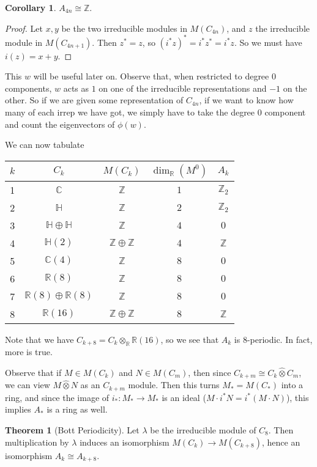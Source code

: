 \documentclass{shortart}
\theoremstyle{definition}
\newtheorem*{cor}{Corollary}
\newtheorem*{thm}{Theorem}
\newcommand\R{\mathbb{R}}
\newcommand\C{\mathbb{C}}
\renewcommand\H{\mathbb{H}}
\newcommand\Z{\mathbb{Z}}
\newcommand\gotimes{\mathbin{\hat\otimes}}
\begin{document}
\begin{cor}
  $A_{4n} \cong \Z$.
\end{cor}

\begin{proof}
  Let $x, y$ be the two irreducible modules in $M(C_{4n})$, and $z$ the irreducible module in $M(C_{4n + 1})$. Then $z^* = z$, so $(i^*z)^* = i^*z^* = i^*z$. So we must have $i(z) = x + y$.
\end{proof}
This $w$ will be useful later on. Observe that, when restricted to degree $0$ components, $w$ acts as $1$ on one of the irreducible representations and $-1$ on the other. So if we are given some representation of $C_{4n}$, if we want to know how many of each irrep we have got, we simply have to take the degree $0$ component and count the eigenvectors of $\phi(w)$.

We can now tabulate
\begin{center}
  \begin{tabular}{ccccc}
    \toprule
    $k$ & $C_k$ & $M(C_k)$ & $\dim_\R (M^0)$ & $A_k$\\
    \midrule
    1 & $\C$ & $\Z$ & $1$ & $\Z_2$\\
    2 & $\H$ & $\Z$ & $2$ & $\Z_2$\\
    3 & $\H \oplus \H$ & $\Z$ & $4$  & $0$\\
    4 & $\H(2)$ & $\Z \oplus \Z$ & $4$& $\Z$\\
    5 & $\C(4)$ & $\Z$ & $8$ & $0$\\
    6 & $\R(8)$ & $\Z$ & $8$ & $0$\\
    7 & $\R(8) \oplus \R(8)$ & $\Z$ & $8$ & $0$\\
    8 & $\R(16)$ & $\Z \oplus \Z$ & $8$& $\Z$\\
    \bottomrule
  \end{tabular}
\end{center}
Note that we have $C_{k + 8} = C_k \otimes_\R \R(16)$, so we see that $A_k$ is $8$-periodic. In fact, more is true.

Observe that if $M \in M(C_k)$ and $N \in M(C_m)$, then since $C_{k + m} \cong C_k \gotimes C_m$, we can view $M \gotimes N$ as an $C_{k + m}$ module. Then this turns $M_* = M(C_*)$ into a ring, and since the image of $i_*: M_* \to M_*$ is an ideal ($M \cdot i^* N = i^* (M \cdot N)$), this implies $A_*$ is a ring as well.

\begin{thm}[Bott Periodicity]
  Let $\lambda$ be the irreducible module of $C_8$. Then multiplication by $\lambda$ induces an isomorphism $M(C_k) \to M(C_{k + 8})$, hence an isomorphism $A_k \cong A_{k + 8}$.
\end{thm}
\end{document}
